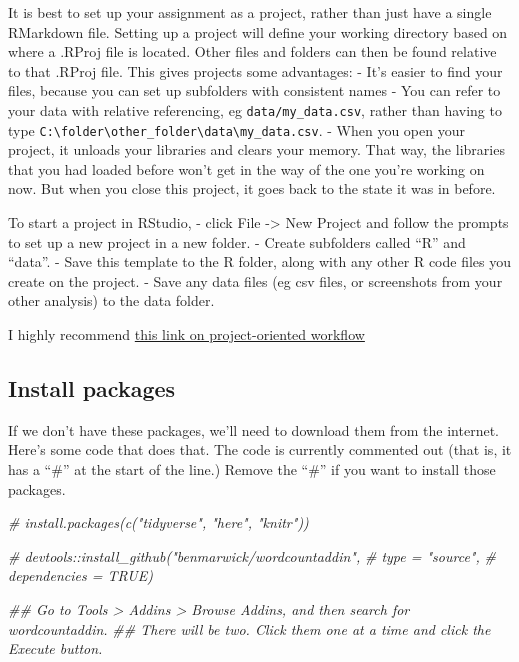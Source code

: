 \documentclass[
]{article}
\newenvironment{Shaded}{\begin{snugshade}}{\end{snugshade}}
\newcommand{\CommentTok}[1]{\textcolor[rgb]{0.56,0.35,0.01}{\textit{#1}}}
\begin{document}
It is best to set up your assignment as a project, rather than just have
a single RMarkdown file. Setting up a project will define your working
directory based on where a .RProj file is located. Other files and
folders can then be found relative to that .RProj file. This gives
projects some advantages: - It's easier to find your files, because you
can set up subfolders with consistent names - You can refer to your data
with relative referencing, eg \texttt{data/my\_data.csv}, rather than
having to type
\texttt{C:\textbackslash{}folder\textbackslash{}other\_folder\textbackslash{}data\textbackslash{}my\_data.csv}.
- When you open your project, it unloads your libraries and clears your
memory. That way, the libraries that you had loaded before won't get in
the way of the one you're working on now. But when you close this
project, it goes back to the state it was in before.

To start a project in RStudio, - click File -\textgreater{} New Project
and follow the prompts to set up a new project in a new folder. - Create
subfolders called ``R'' and ``data''. - Save this template to the R
folder, along with any other R code files you create on the project. -
Save any data files (eg csv files, or screenshots from your other
analysis) to the data folder.

I highly recommend
\href{\%22https://www.tidyverse.org/articles/2017/12/workflow-vs-script/\%22}{this
link on project-oriented workflow}

\hypertarget{install-packages}{%
\subsection{Install packages}\label{install-packages}}

If we don't have these packages, we'll need to download them from the
internet. Here's some code that does that. The code is currently
commented out (that is, it has a ``\#'' at the start of the line.)
Remove the ``\#'' if you want to install those packages.

\begin{Shaded}
\begin{Highlighting}[]
\CommentTok{# install.packages(c("tidyverse", "here", "knitr"))}

\CommentTok{# devtools::install_github("benmarwick/wordcountaddin", }
\CommentTok{#                         type = "source", }
\CommentTok{#                         dependencies = TRUE)}

\CommentTok{## Go to Tools > Addins > Browse Addins, and then search for wordcountaddin. }
\CommentTok{## There will be two. Click them one at a time and click the Execute button. }
\end{Highlighting}
\end{Shaded}
\end{document}
